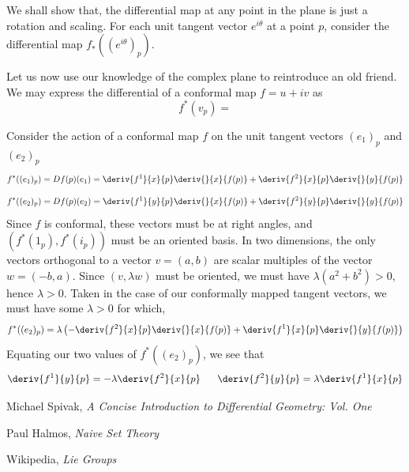 We shall show that, the differential map at any point in the plane is just a rotation and scaling. For each unit tangent vector $e^{i\theta}$ at a point $p$, consider the differential map $f_*((e^{i\theta})_p)$.

Let us now use our knowledge of the complex plane to reintroduce an old friend. We may express the differential of a conformal map $f = u + iv$ as
%
\[ f^*(v_p) = \]

Consider the action of a conformal map $f$ on the unit tangent vectors $(e_1)_p$ and $(e_2)_p$
%
\[ f^*((e_1)_p) = Df(p)(e_1) = \deriv{f^1}{x}{p} \deriv{}{x}{f(p)} + \deriv{f^2}{x}{p} \deriv{}{y}{f(p)} \]
%
\[ f^*((e_2)_p) = Df(p)(e_2) = \deriv{f^1}{y}{p} \deriv{}{x}{f(p)} + \deriv{f^2}{y}{p} \deriv{}{y}{f(p)} \]
%
Since $f$ is conformal, these vectors must be at right angles, and $(f^*(1_p), f^*(i_p))$ must be an oriented basis. In two dimensions, the only vectors orthogonal to a vector $v = (a,b)$ are scalar multiples of the vector $w = (-b,a)$. Since $(v, \lambda w)$ must be oriented, we must have $\lambda (a^2 + b^2) > 0$, hence $\lambda > 0$. Taken in the case of our conformally mapped tangent vectors, we must have some $\lambda > 0$ for which,
%
\[ f^*((e_2)_p) = \lambda \left( -\deriv{f^2}{x}{p} \deriv{}{x}{f(p)} + \deriv{f^1}{x}{p} \deriv{}{y}{f(p)} \right) \]
%
Equating our two values of $f^*((e_2)_p)$, we see that
%
\[ \deriv{f^1}{y}{p} = - \lambda \deriv{f^2}{x}{p}\ \ \ \ \ \deriv{f^2}{y}{p} = \lambda \deriv{f^1}{x}{p} \]

\begin{thebibliography}{10}
     Michael Spivak,
    \emph{A Concise Introduction to Differential Geometry: Vol. One}

     Paul Halmos,
    \emph{Naive Set Theory}

     Wikipedia,
    \emph{Lie Groups}
\end{thebibliography}

